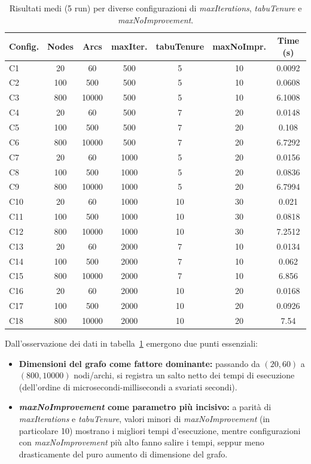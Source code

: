\begin{table}[h!]
\centering
\caption{Risultati medi (5 run) per diverse configurazioni di \emph{maxIterations}, \emph{tabuTenure} e \emph{maxNoImprovement}.}
\label{tab:risultati1}
\begin{tabular}{l|c|c|c|c|c|c}
\hline
\textbf{Config.} & \textbf{Nodes} & \textbf{Arcs} & \textbf{maxIter.} & \textbf{tabuTenure} & \textbf{maxNoImpr.} & \textbf{Time (s)} \\
\hline
C1 & 20 & 60 & 500 & 5 & 10 & 0.0092 \\
C2 & 100 & 500 & 500 & 5 & 10 & 0.0608 \\
C3 & 800 & 10000 & 500 & 5 & 10 & 6.1008 \\
C4 & 20 & 60 & 500 & 7 & 20 & 0.0148 \\
C5 & 100 & 500 & 500 & 7 & 20 & 0.108\\
C6 & 800 & 10000 & 500 & 7 & 20 & 6.7292 \\
C7 & 20 & 60 & 1000 & 5 & 20 & 0.0156 \\
C8 & 100 & 500 & 1000 & 5 & 20 & 0.0836 \\
C9 & 800 & 10000 & 1000 & 5 & 20 & 6.7994 \\
C10 & 20 & 60 & 1000 & 10 & 30 & 0.021 \\
C11 & 100 & 500 & 1000 & 10 & 30 & 0.0818 \\
C12 & 800 & 10000 & 1000 & 10 & 30 & 7.2512 \\
C13 & 20 & 60 & 2000 & 7 & 10 & 0.0134 \\
C14 & 100 & 500 & 2000 & 7 & 10 & 0.062 \\
C15 & 800 & 10000 & 2000 & 7 & 10 & 6.856 \\
C16 & 20 & 60 & 2000 & 10 & 20 & 0.0168 \\
C17 & 100 & 500 & 2000 & 10 & 20 & 0.0926 \\
C18 & 800 & 10000 & 2000 & 10 & 20 & 7.54 \\
\hline
\end{tabular}
\end{table}

\noindent
Dall’osservazione dei dati in tabella~\ref{tab:risultati1} emergono due punti essenziali:
\begin{itemize}
    \item \textbf{Dimensioni del grafo come fattore dominante:}
    passando da \((20,60)\) a \((800,10000)\) nodi/archi, si registra un salto netto dei tempi di esecuzione (dell’ordine di microsecondi-millisecondi a svariati secondi).

    \item \textbf{\emph{maxNoImprovement} come parametro più incisivo:}
    a parità di \emph{maxIterations} e \emph{tabuTenure}, valori minori di \emph{maxNoImprovement} (in particolare 10) mostrano i migliori tempi d’esecuzione, mentre configurazioni con \emph{maxNoImprovement} più alto fanno salire i tempi, seppur meno drasticamente del puro aumento di dimensione del grafo.
\end{itemize}

